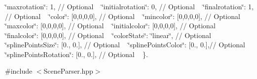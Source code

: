  \char`\"{}maxrotation\char`\"{}\+: 1, // Optional ~\newline
 \char`\"{}initialrotation\char`\"{}\+: 0, // Optional ~\newline
 \char`\"{}finalrotation\char`\"{}\+: 1, // Optional ~\newline
 \char`\"{}color\char`\"{}\+: \mbox{[}0,0,0,0\mbox{]}, // Optional ~\newline
 \char`\"{}mincolor\char`\"{}\+: \mbox{[}0,0,0,0\mbox{]}, // Optional ~\newline
 \char`\"{}maxcolor\char`\"{}\+: \mbox{[}0,0,0,0\mbox{]}, // Optional ~\newline
 \char`\"{}initialcolor\char`\"{}\+: \mbox{[}0,0,0,0\mbox{]}, // Optional ~\newline
 \char`\"{}finalcolor\char`\"{}\+: \mbox{[}0,0,0,0\mbox{]}, // Optional ~\newline
 \char`\"{}color\+State\char`\"{}\+: \char`\"{}linear\char`\"{}, // Optional ~\newline
 \char`\"{}spline\+Points\+Size\char`\"{}\+: \mbox{[}0., 0.\mbox{]}, // Optional ~\newline
 \char`\"{}spline\+Points\+Color\char`\"{}\+: \mbox{[}0., 0.\mbox{]},// Optional ~\newline
 \char`\"{}spline\+Points\+Rotation\char`\"{}\+: \mbox{[}0., 0.\mbox{]}, // Optional ~\newline
 \}.  




{\ttfamily \#include $<$Scene\+Parser.\+hpp$>$}

